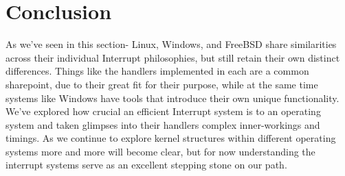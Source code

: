 \documentclass[10pt,draftclsnofoot,onecolumn]{IEEEtran}
\begin{document}
\section{Conclusion}
\label{sec:Conclusion}
As we've seen in this section- Linux, Windows, and FreeBSD share similarities across their individual Interrupt philosophies, but still retain their own distinct differences.
Things like the handlers implemented in each are a common sharepoint, due to their great fit for their purpose, while at the same time systems like Windows have tools that introduce their own unique functionality.
We've explored how crucial an efficient Interrupt system is to an operating system and taken glimpses into their handlers complex inner-workings and timings.
As we continue to explore kernel structures within different operating systems more and more will become clear, but for now understanding the interrupt systems serve as an excellent stepping stone on our path.

%
%
%



\end{document}
